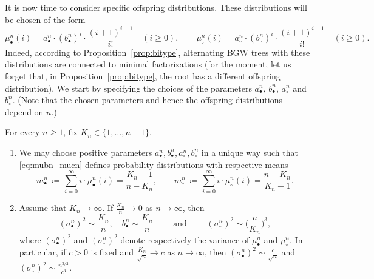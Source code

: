 \documentclass[10pt]{amsart}
\theoremstyle{definition}\newtheorem{defi}[theo]{Definition}\newtheorem{rema}[theo]{Remark}\newtheorem{exam}[theo]{Example}\newtheorem{exem}[theo]{Example}\newtheorem{nota}[theo]{Notation}
\def\abn{a_{\bullet}^{n}}
\def\acn{a_{\circ}^{n}}
\def\bbn{b_{\bullet}^{n}}
\def\bcn{b_{\circ}^{n}}
\def\mubn{\mu_{\bullet}^{n}}
\def\mucn{\mu_{\circ}^{n}}
\def\scn{\sigma_{\circ}^{n}}
\def\sbn{\sigma_{\bullet}^{n}}
\begin{document}
It is now time to consider specific offspring distributions.
These distributions will be chosen of the form
\begin{equation}
  \mubn(i)= \abn \cdot  (\bbn)^{i} \cdot \frac{(i+1)^{i-1}}{i!}  \quad (i \geq 0), \qquad \mucn(i)= \acn \cdot  (\bcn)^{i} \cdot \frac{(i+1)^{i-1}}{i!}  \quad (i \geq 0).
  \label{eq:mubn_mucn}
\end{equation}
Indeed, according to Proposition~\ref{prop:bitype},
alternating BGW trees with these distributions are connected to minimal factorizations
(for the moment, let us forget that, in Proposition~\ref{prop:bitype}, the root has a different offspring distribution).
We start by specifying the choices of the parameters
$\abn$, $\bbn$, $\acn$ and $\bcn$.
(Note that the chosen parameters and hence the offspring distributions depend on $n$.)

\begin{lemma}\label{lem:exist} For every $n \ge 1$,  fix $K_{n} \in \{1,\dots,n-1\}$.
\begin{enumerate}
  \item[(i)] We may choose positive parameters  $\abn,\bbn,\acn,\bcn$ in a unique way  such that \eqref{eq:mubn_mucn}
defines probability distributions with respective means
\[m^{n}_{\bullet}  \, \coloneqq  \, \sum_{i=0}^{\infty} i \cdot \mubn(i)= \frac{K_{n}+1}{n-K_{n}}, \qquad m^{n}_{\circ} \, \coloneqq \, \sum_{i=0}^{\infty} i \cdot \mucn(i)= \frac{n-K_{n}}{K_{n}+1}.\]
\item[(ii)] Assume that $K_{n} \rightarrow \infty$. If $\tfrac{K_{n}}{n} \rightarrow 0$ as $n \rightarrow \infty$, then
\[(\sbn)^{2} \sim \frac{K_{n}}{n}, \quad  \bbn \sim \frac{K_{n}}{n}  \qquad \text{ and } \qquad  (\scn)^{2} \sim   \big( \frac{n}{K_{n}} \big)^{3},\]
where $(\sbn)^{2}$ and $(\scn)^{2}$ denote respectively the variance of $\mubn$ and $\mucn$.
In particular, if $c>0$ is fixed and $\tfrac{K_{n}}{\sqrt{n}} \rightarrow c$ as $n \rightarrow \infty$, then   $ (\sbn)^{2} \sim \tfrac{c}{\sqrt{n}}$ and $(\scn)^{2} \sim  \frac{n^{3/2}}{c^{3}}$.
\end{enumerate}
\end{lemma}
\end{document}
